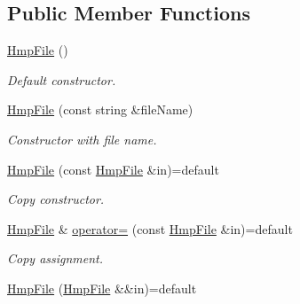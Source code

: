 \subsection*{Public Member Functions}
\begin{DoxyCompactItemize}
\item 
\mbox{\label{classvarfiles_1_1_hmp_file_a1233c1cf4827d5401e9315d5353970e1}} 
\hyperlink{classvarfiles_1_1_hmp_file_a1233c1cf4827d5401e9315d5353970e1}{Hmp\+File} ()
\begin{DoxyCompactList}\small\item\em Default constructor. \end{DoxyCompactList}\item 
\hyperlink{classvarfiles_1_1_hmp_file_a0dc8516bceccd0fc31115a60f3f4c58c}{Hmp\+File} (const string \&file\+Name)
\begin{DoxyCompactList}\small\item\em Constructor with file name. \end{DoxyCompactList}\item 
\mbox{\label{classvarfiles_1_1_hmp_file_a551f1b488116655ebeeefb836eb5f2e9}} 
\hyperlink{classvarfiles_1_1_hmp_file_a551f1b488116655ebeeefb836eb5f2e9}{Hmp\+File} (const \hyperlink{classvarfiles_1_1_hmp_file}{Hmp\+File} \&in)=default
\begin{DoxyCompactList}\small\item\em Copy constructor. \end{DoxyCompactList}\item 
\mbox{\label{classvarfiles_1_1_hmp_file_a87ab285be0ffe0efed6076a9abc024ef}} 
\hyperlink{classvarfiles_1_1_hmp_file}{Hmp\+File} \& \hyperlink{classvarfiles_1_1_hmp_file_a87ab285be0ffe0efed6076a9abc024ef}{operator=} (const \hyperlink{classvarfiles_1_1_hmp_file}{Hmp\+File} \&in)=default
\begin{DoxyCompactList}\small\item\em Copy assignment. \end{DoxyCompactList}\item 
\mbox{\label{classvarfiles_1_1_hmp_file_a4b6b531eb9087151ec34326c53d73bbe}} 
\hyperlink{classvarfiles_1_1_hmp_file_a4b6b531eb9087151ec34326c53d73bbe}{Hmp\+File} (\hyperlink{classvarfiles_1_1_hmp_file}{Hmp\+File} \&\&in)=default

\end{DoxyCompactItemize}
